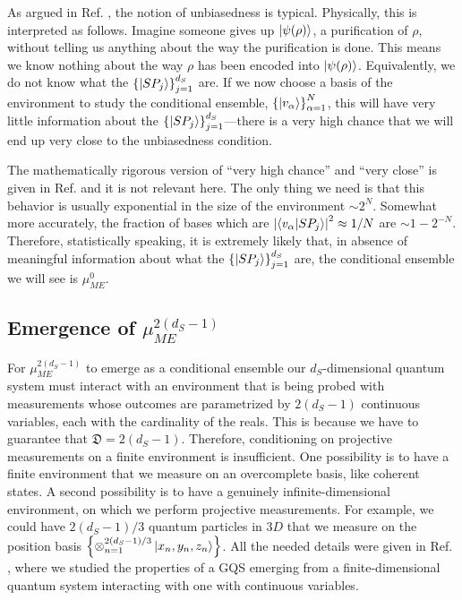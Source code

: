 \documentclass[draft,nofootinbib,pre,twocolumn,showpacs,showkeys,groupaddress,preprintnumbers,floatfix]{revtex4-1}
\newcommand{\1}{\mathbbm{1}}
\newcommand{\ID}{\mathfrak{D}}
\begin{document}
As argued in Ref. \cite{Anza2018}, the notion of unbiasedness is typical.
Physically, this is interpreted as follows. Imagine someone gives up
$\ket{\psi(\rho)}$, a purification of $\rho$, without telling us anything about
the way the purification is done. This means we know nothing about the way
$\rho$ has been encoded into $\ket{\psi(\rho)}$. Equivalently, we do not know
what the $\left\{\ket{SP_j}\right\}_{j=1}^{d_S}$ are. If we now choose a basis
of the environment to study the conditional ensemble, $\left\{
\ket{v_\alpha}\right\}_{\alpha=1}^{N}$, this will have very little information
about the $\left\{\ket{SP_j}\right\}_{j=1}^{d_S}$---there is a very high chance
that we will end up very close to the unbiasedness condition.

The mathematically rigorous version of ``very high chance'' and ``very close''
is given in Ref. \cite{Anza2018} and it is not relevant here. The only thing we
need is that this behavior is usually exponential in the size of the
environment $\sim 2^{N}$. Somewhat more accurately, the fraction of bases which
are $\left| \braket{v_\alpha}{SP_j}\right|^2 \approx 1/N$ are $\sim 1-2^{-N}$.
Therefore, statistically speaking, it is extremely likely that, in absence of
meaningful information about what the $\left\{ \ket{SP_j}\right\}_{j=1}^{d_S}$
are, the conditional ensemble we will see is $\mu_{ME}^{0}$.

\subsection*{Emergence of $\mu_{ME}^{2(d_S-1)}$}

For $\mu_{ME}^{2(d_S-1)}$ to emerge as a conditional ensemble our
$d_S$-dimensional quantum system must interact with an environment that is
being probed with measurements whose outcomes are parametrized by $2(d_S-1)$
continuous variables, each with the cardinality of the reals. This is because
we have to guarantee that $\ID = 2(d_S-1)$. Therefore, conditioning on
projective measurements on a finite environment is insufficient. One
possibility is to have a finite environment that we measure on an overcomplete
basis, like coherent states. A second possibility is to have a genuinely
infinite-dimensional environment, on which we perform projective measurements.
For example, we could have $2(d_S-1)/3$ quantum particles in $3D$ that we
measure on the position basis
$\left\{\otimes_{n=1}^{2(d_S-1)/3}\ket{x_n,y_n,z_n}\right\}$. All the needed
details were given in Ref. \cite{Anza20a}, where we studied the properties of a
GQS emerging from a finite-dimensional quantum system interacting with one with
continuous variables.
\end{document}
